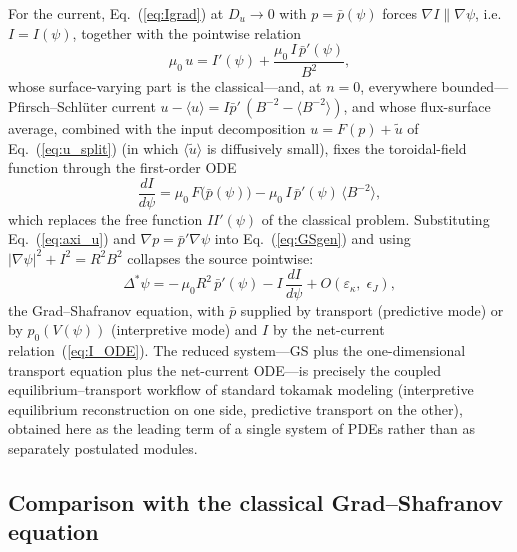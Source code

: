 \documentclass[english]{article}
\begin{document}
For the current, Eq.~(\ref{eq:Igrad}) at $D_u\rightarrow0$ with $p=\bar p(\psi)$ forces
$\nabla I\parallel\nabla\psi$, i.e.\ $I=I(\psi)$, together with the pointwise relation
\begin{equation}
\mu_0\,u=I'(\psi)+\frac{\mu_0\,I\,\bar p'(\psi)}{B^{2}} ,
\label{eq:axi_u}
\end{equation}
whose surface-varying part is the classical---and, at $n=0$, everywhere bounded---%
Pfirsch--Schl\"uter current $u-\langle u\rangle=I\bar p'\,(B^{-2}-\langle B^{-2}\rangle)$, and
whose flux-surface average, combined with the input decomposition $u=F(p)+\tilde u$ of
Eq.~(\ref{eq:u_split}) (in which $\langle\tilde u\rangle$ is diffusively small), fixes the
toroidal-field function through the first-order ODE
\begin{equation}
\frac{dI}{d\psi}=\mu_0\,F\big(\bar p(\psi)\big)-\mu_0\,I\,\bar p'(\psi)\,\langle B^{-2}\rangle ,
\label{eq:I_ODE}
\end{equation}
which replaces the free function $II'(\psi)$ of the classical problem. Substituting
Eq.~(\ref{eq:axi_u}) and $\nabla p=\bar p'\nabla\psi$ into Eq.~(\ref{eq:GSgen}) and using
$|\nabla\psi|^{2}+I^{2}=R^{2}B^{2}$ collapses the source pointwise:
\begin{equation}
\Delta^*\psi=-\,\mu_0R^{2}\,\bar p'(\psi)-I\,\frac{dI}{d\psi}
+O(\varepsilon_\kappa,\;\epsilon_J) ,
\label{eq:GS_recovered}
\end{equation}
the Grad--Shafranov equation, with $\bar p$ supplied by transport (predictive mode) or by
$p_0(V(\psi))$ (interpretive mode) and $I$ by the net-current relation~(\ref{eq:I_ODE}). The
reduced system---GS plus the one-dimensional transport equation plus the net-current ODE---is
precisely the coupled equilibrium--transport workflow of standard tokamak modeling (interpretive
equilibrium reconstruction on one side, predictive transport on the other), obtained here as the
leading term of a single system of PDEs rather than as separately postulated modules.

\subsection{Comparison with the classical Grad--Shafranov equation}
\label{sec:axisym_compare}
\end{document}
